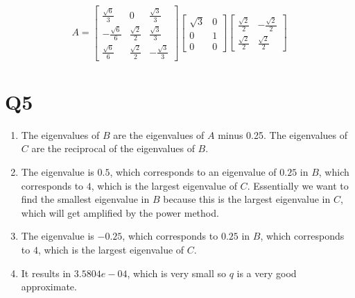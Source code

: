 \documentclass{article}
\begin{document}
\[
  A = \begin{bmatrix}
    \frac{\sqrt{6}}{3} & 0 & \frac{\sqrt{3}}{3} \\
    -\frac{\sqrt{6}}{6} & \frac{\sqrt{2}}{2} & \frac{\sqrt{3}}{3} \\
    \frac{\sqrt{6}}{6} & \frac{\sqrt{2}}{2} & -\frac{\sqrt{3}}{3}
  \end{bmatrix}  
  \begin{bmatrix}
    \sqrt{3} & 0 \\
    0 & 1 \\
    0 & 0
  \end{bmatrix}
  \begin{bmatrix}
    \frac{\sqrt{2}}{2} & -\frac{\sqrt{2}}{2} \\
    \frac{\sqrt{2}}{2} & \frac{\sqrt{2}}{2}
  \end{bmatrix}
\]
\newpage 

\section*{Q5}
\begin{enumerate}
    \item The eigenvalues of $B$ are the eigenvalues of $A$ minus 0.25.
    The eigenvalues of $C$ are the reciprocal of the eigenvalues of $B$.
    \item The eigenvalue is $0.5$, which corresponds to an eigenvalue of $0.25$
    in $B$, which corresponds to $4$, which is the largest eigenvalue of $C$.
    Essentially we want to find the smallest eigenvalue in $B$ because this is the 
    largest eigenvalue in $C$, which will get amplified by the power method.
    \item The eigenvalue is $-0.25$, which corresponds to $0.25$ in $B$,
    which corresponds to $4$, which is the largest eigenvalue of $C$.
    \item It results in $3.5804e-04$, which is very small so $q$ is a very
    good approximate.
\end{enumerate}
\end{document}
